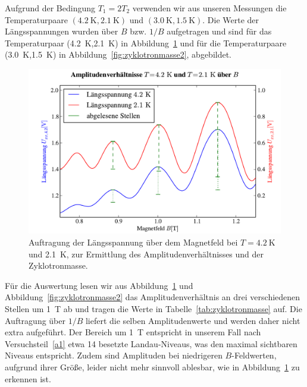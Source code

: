 \documentclass[paper=a4,fontsize=10pt,DIV=18,twocolumn,parskip=half]{scrartcl}
\numberwithin{equation}{section}    %
\newcommand{\kor}[1]{{\color{darkgreen}#1}}
\begin{document}
Aufgrund der Bedingung $T_{1}=2T_{2}$ verwenden wir aus unseren Messungen die Temperaturpaare $(\SI{4.2}{\kelvin},\SI{2.1}{\kelvin})$ und $(\SI{3.0}{\kelvin},\SI{1.5}{\kelvin})$. \kor{Die Werte der Längsspannungen wurden über $B$ bzw. $1/B$ aufgetragen und sind für das Temperaturpaar (\SI{4.2}{\kelvin},\SI{2.1}{\kelvin}) in Abbildung~\ref{fig:zyklotronmasse} und für die Temperaturpaare (\SI{3.0}{\kelvin},\SI{1.5}{\kelvin}) in Abbildung~\ref{fig:zyklotronmasse2}, abgebildet.}
\begin{figure}[htp]
	\begin{center}
		\includegraphics[width=\columnwidth]{Data-Plots/11-4,2-2,1-zyklotron-B.pdf}
		\caption{Auftragung der Längsspannung über dem Magnetfeld bei $T=\SI{4.2}{\kelvin}$ und \SI{2.1}{\kelvin}, zur Ermittlung des Amplitudenverhältnisses und der Zyklotronmasse.}
		\label{fig:zyklotronmasse}
	\end{center}
\end{figure}
\kor{
Für die Auswertung lesen wir aus Abbildung~\ref{fig:zyklotronmasse} und Abbildung~\ref{fig:zyklotronmasse2} das Amplitudenverhältnis an drei verschiedenen Stellen um \SI{1}{\tesla} ab und tragen die Werte in Tabelle~\ref{tab:zyklotronmasse} auf. Die Auftragung über $1/B$ liefert die selben Amplitudenwerte und werden daher nicht extra aufgeführt. Der Bereich um \SI{1}{\tesla} entspricht in unserem Fall nach Versuchsteil~\ref{a1} etwa 14 besetzte Landau-Niveaus, was den maximal sichtbaren Niveaus entspricht. Zudem sind Amplituden bei niedrigeren $B$-Feldwerten, aufgrund ihrer Größe, leider nicht mehr sinnvoll ablesbar, wie in Abbildung~\ref{fig:zyklotronmasse} zu erkennen ist.
}
\end{document}
